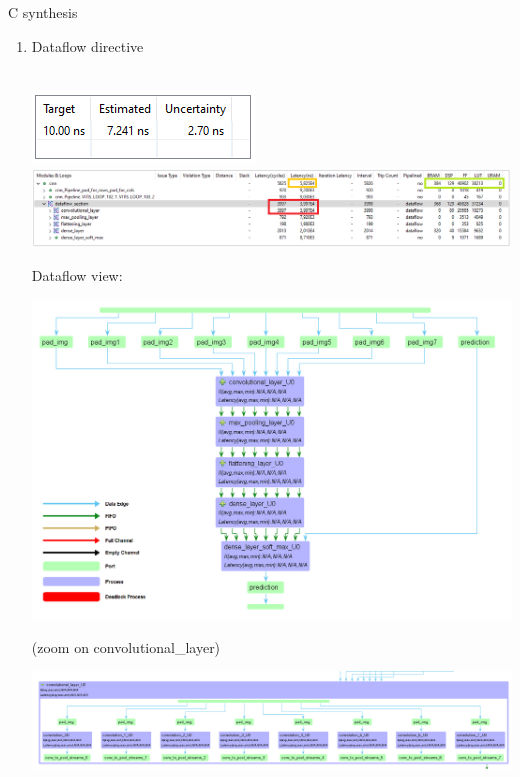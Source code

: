 \documentclass[10pt, xcolor=dvipsnames, compress]{beamer}
\begin{document}
\begin{frame}[allowframebreaks]{C synthesis}
\begin{enumerate}
        \item Dataflow directive\\~\

        \includegraphics[width=.2\textwidth]{synthesis-result/opt_full_timing.png}
        \linebreak
        \includegraphics[width=\textwidth]{synthesis-result/opt_full_detail.png}

    \framebreak
        Dataflow view:
        \begin{center}
            \includegraphics[width=.58\textwidth]{dataflow-view.png}
        \end{center}
        \tiny{(zoom on convolutional\_layer)}
        \begin{center}
            \includegraphics[width=.76\textwidth]{dataflow-view-zoom.png}
        \end{center}

    \end{enumerate}
\end{frame}
\end{document}
